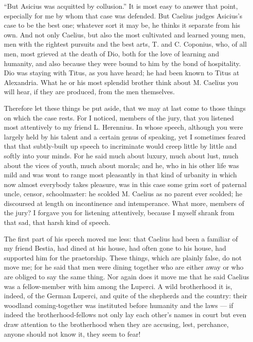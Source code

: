  ``But Asicius was acquitted by collusion.'' It is most easy to answer that point, especially for me by whom that case was defended. But Caelius judges Asicius's case to be the best one; whatever sort it may be, he thinks it separate from his own. And not only Caelius, but also the most cultivated and learned young men, men with the rightest pursuits and the best arts, T. and C. Coponius, who, of all men, most grieved at the death of Dio, both for the love of learning and humanity, and also because they were bound to him by the bond of hospitality. Dio was staying with Titus, as you have heard; he had been known to Titus at Alexandria. What he or his most splendid brother think about M. Caelius you will hear, if they are produced, from the men themselves.

 Therefore let these things be put aside, that we may at last come to those things on which the case rests. For I noticed, members of the jury, that you listened most attentively to my friend L. Herennius. In whose speech, although you were largely held by his talent and a certain genus of speaking, yet I sometimes feared that that subtly-built up speech to incriminate would creep little by little and softly into your minds. For he said much about luxury, much about lust, much about the vices of youth, much about morals; and he, who in his other life was mild and was wont to range most pleasantly in that kind of urbanity in which now almost everybody takes pleasure, was in this case some grim sort of paternal uncle, censor, schoolmaster: he scolded M. Caelius as no parent ever scolded; he discoursed at length on incontinence and intemperance. What more, members of the jury? I forgave you for listening attentively, because I myself shrank from that sad, that harsh kind of speech.

 The first part of his speech moved me less: that Caelius had been a familiar of my friend Bestia, had dined at his house, had often gone to his house, had supported him for the praetorship. These things, which are plainly false, do not move me; for he said that men were dining together who are either away or who are obliged to say the same thing. Nor again does it move me that he said Caelius was a fellow-member with him among the Luperci. A wild brotherhood it is, indeed, of the German Luperci, and quite of the shepherds and the country: their woodland coming-together was instituted before humanity and the laws --- if indeed the brotherhood-fellows not only lay each other's names in court but even draw attention to the brotherhood when they are accusing, lest, perchance, anyone should not know it, they seem to fear!


